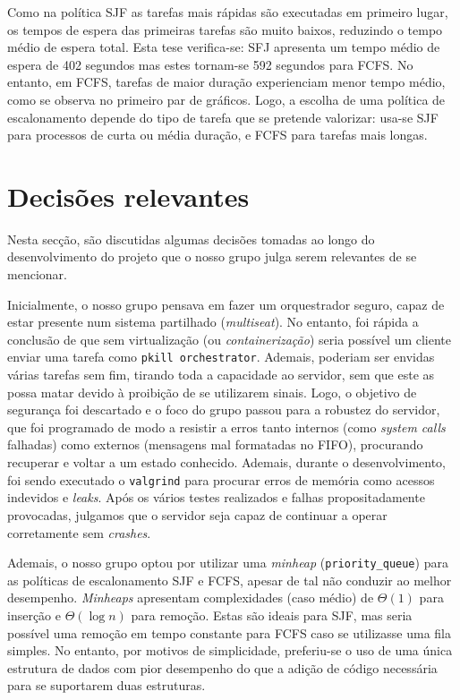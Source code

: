 \documentclass[11pt]{article}
\begin{document}
Como na política SJF as tarefas mais rápidas são executadas em primeiro lugar, os tempos de espera
das primeiras tarefas são muito baixos, reduzindo o tempo médio de espera total. Esta tese
verifica-se: SFJ apresenta um tempo médio de espera de 402 segundos mas estes tornam-se 592 segundos
para FCFS. No entanto, em FCFS, tarefas de maior duração experienciam menor tempo médio, como se
observa no primeiro par de gráficos. Logo, a escolha de uma política de escalonamento depende do
tipo de tarefa que se pretende valorizar: usa-se SJF para processos de curta ou média duração, e
FCFS para tarefas mais longas.

\section{Decisões relevantes}

Nesta secção, são discutidas algumas decisões tomadas ao longo do desenvolvimento do projeto que o
nosso grupo julga serem relevantes de se mencionar.

Inicialmente, o nosso grupo pensava em fazer um orquestrador seguro, capaz de estar presente num
sistema partilhado (\emph{multiseat}). No entanto, foi rápida a conclusão de que sem virtualização
(ou \emph{containerização}) seria possível um cliente enviar uma tarefa como \texttt{pkill
orchestrator}. Ademais, poderiam ser envidas várias tarefas sem fim, tirando toda a capacidade ao
servidor, sem que este as possa matar devido à proibição de se utilizarem sinais. Logo, o objetivo
de segurança foi descartado e o foco do grupo passou para a robustez do servidor, que foi programado
de modo a resistir a erros tanto internos (como \emph{system calls} falhadas) como externos
(mensagens mal formatadas no FIFO), procurando recuperar e voltar a um estado conhecido. Ademais,
durante o desenvolvimento, foi sendo executado o \texttt{valgrind} \cite{valgrind} para procurar
erros de memória como acessos indevidos e \emph{leaks}. Após os vários testes realizados e falhas
propositadamente provocadas, julgamos que o servidor seja capaz de continuar a operar corretamente
sem \emph{crashes}.

Ademais, o nosso grupo optou por utilizar uma \emph{minheap} (\texttt{priority\_queue}) para as
políticas de escalonamento SJF e FCFS, apesar de tal não conduzir ao melhor desempenho.
\emph{Minheaps} apresentam complexidades (caso médio) de $\Theta(1)$ para inserção e
$\Theta(\log n)$ para remoção. Estas são ideais para SJF, mas seria possível uma remoção em tempo
constante para FCFS caso se utilizasse uma fila simples. No entanto, por motivos de simplicidade,
preferiu-se o uso de uma única estrutura de dados com pior desempenho do que a adição de código
necessária para se suportarem duas estruturas.
\end{document}
